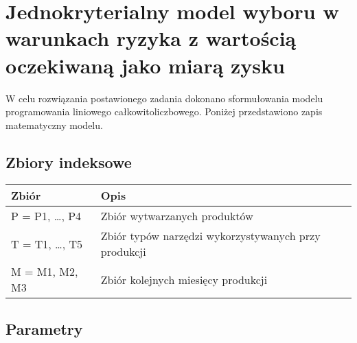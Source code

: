 \documentclass{article}
\begin{document}
\section{Jednokryterialny model wyboru w warunkach ryzyka z wartością oczekiwaną jako miarą zysku}

W celu rozwiązania postawionego zadania dokonano sformułowania modelu programowania liniowego całkowitoliczbowego. Poniżej przedstawiono zapis matematyczny modelu.

\subsection{Zbiory indeksowe}

\begin{table}[H]
\centering
\begin{tabular}{|l|l|}
\hline
Zbiór & Opis \\
\hline
P = P1, \ldots, P4 & Zbiór wytwarzanych produktów \\
\hline
T = T1, \ldots, T5 & Zbiór typów narzędzi wykorzystywanych przy produkcji \\
\hline
M = M1, M2, M3 & Zbiór kolejnych miesięcy produkcji \\
\hline
\end{tabular}
\end{table}

\subsection{Parametry}
\end{document}
